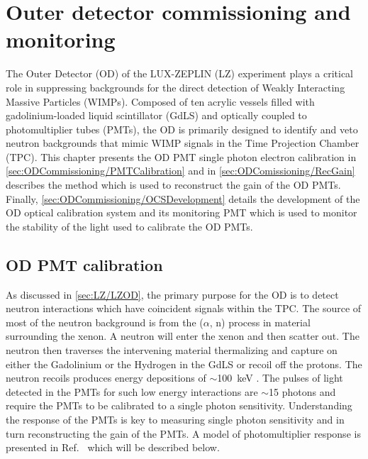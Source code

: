 \chapter{Outer detector commissioning and monitoring}\label{chap:ODCommissioning}
The Outer Detector (OD) of the LUX-ZEPLIN (LZ) experiment plays a critical role in suppressing backgrounds for the direct detection of Weakly Interacting Massive Particles (WIMPs). Composed of ten acrylic vessels filled with gadolinium-loaded liquid scintillator (GdLS) and optically coupled to photomultiplier tubes (PMTs), the OD is primarily designed to identify and veto neutron backgrounds that mimic WIMP signals in the Time Projection Chamber (TPC). This chapter presents the OD PMT single photon electron calibration in \autoref{sec:ODCommissioning/PMTCalibration} and in \autoref{sec:ODComissioning/RecGain} describes the method which is used to reconstruct the gain of the OD PMTs. Finally, \autoref{sec:ODCommissioning/OCSDevelopment} details the development of the OD optical calibration system and its monitoring PMT which is used to monitor the stability of the light used to calibrate the OD PMTs.

\section{OD PMT calibration}\label{sec:ODCommissioning/PMTCalibration}
As discussed in \autoref{sec:LZ/LZOD}, the primary purpose for the OD is to detect neutron interactions which have coincident signals within the TPC. The source of most of the neutron background is from the ($\alpha$, n) process in material surrounding the xenon. A neutron will enter the xenon and then scatter out. The neutron then traverses the intervening material thermalizing and capture on either the Gadolinium or the Hydrogen in the GdLS or recoil off the protons. The neutron recoils produces energy depositions of $\sim$100~keV \cite{LZNIMA}. The pulses of light detected in the PMTs for such low energy interactions are $\sim$15 photons and require the PMTs to be calibrated to a single photon sensitivity. Understanding the response of the PMTs is key to measuring single photon sensitivity and in turn reconstructing the gain of the PMTs. A model of photomultiplier response is presented in Ref.~\cite{BELLAMY1994468} which will be described below.
